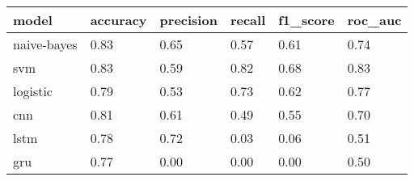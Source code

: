 \begin{tabular}{llllll}
\toprule
model & accuracy & precision & recall & f1_score & roc_auc \\
\midrule
naive-bayes & 0.83 & 0.65 & 0.57 & 0.61 & 0.74 \\
svm & 0.83 & 0.59 & 0.82 & 0.68 & 0.83 \\
logistic & 0.79 & 0.53 & 0.73 & 0.62 & 0.77 \\
cnn & 0.81 & 0.61 & 0.49 & 0.55 & 0.70 \\
lstm & 0.78 & 0.72 & 0.03 & 0.06 & 0.51 \\
gru & 0.77 & 0.00 & 0.00 & 0.00 & 0.50 \\
\bottomrule
\end{tabular}
